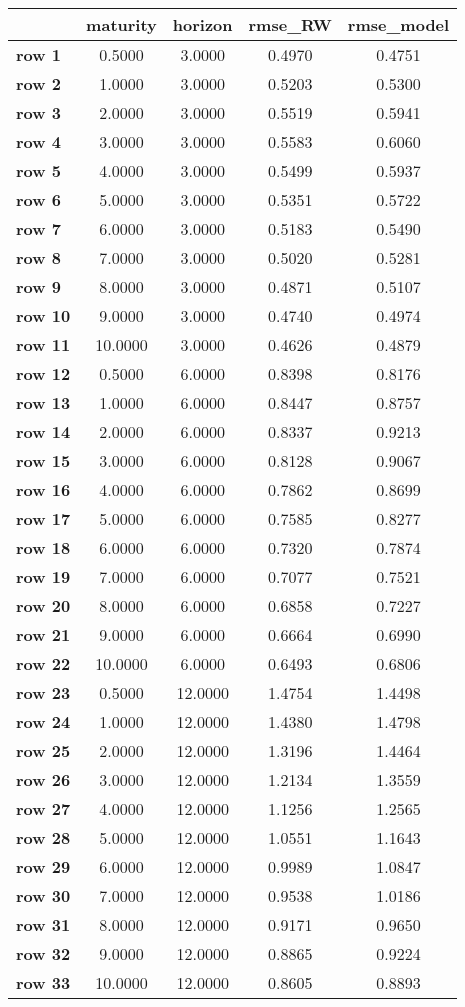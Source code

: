 \begin{tiny}\begin{tabular}{|l|c|c|c|c|}
\hline
&\textbf{maturity}&\textbf{horizon}&\textbf{rmse_RW}&\textbf{rmse_model}\\\hline
\textbf{row 1}&0.5000&3.0000&0.4970&0.4751\\\hline
\textbf{row 2}&1.0000&3.0000&0.5203&0.5300\\\hline
\textbf{row 3}&2.0000&3.0000&0.5519&0.5941\\\hline
\textbf{row 4}&3.0000&3.0000&0.5583&0.6060\\\hline
\textbf{row 5}&4.0000&3.0000&0.5499&0.5937\\\hline
\textbf{row 6}&5.0000&3.0000&0.5351&0.5722\\\hline
\textbf{row 7}&6.0000&3.0000&0.5183&0.5490\\\hline
\textbf{row 8}&7.0000&3.0000&0.5020&0.5281\\\hline
\textbf{row 9}&8.0000&3.0000&0.4871&0.5107\\\hline
\textbf{row 10}&9.0000&3.0000&0.4740&0.4974\\\hline
\textbf{row 11}&10.0000&3.0000&0.4626&0.4879\\\hline
\textbf{row 12}&0.5000&6.0000&0.8398&0.8176\\\hline
\textbf{row 13}&1.0000&6.0000&0.8447&0.8757\\\hline
\textbf{row 14}&2.0000&6.0000&0.8337&0.9213\\\hline
\textbf{row 15}&3.0000&6.0000&0.8128&0.9067\\\hline
\textbf{row 16}&4.0000&6.0000&0.7862&0.8699\\\hline
\textbf{row 17}&5.0000&6.0000&0.7585&0.8277\\\hline
\textbf{row 18}&6.0000&6.0000&0.7320&0.7874\\\hline
\textbf{row 19}&7.0000&6.0000&0.7077&0.7521\\\hline
\textbf{row 20}&8.0000&6.0000&0.6858&0.7227\\\hline
\textbf{row 21}&9.0000&6.0000&0.6664&0.6990\\\hline
\textbf{row 22}&10.0000&6.0000&0.6493&0.6806\\\hline
\textbf{row 23}&0.5000&12.0000&1.4754&1.4498\\\hline
\textbf{row 24}&1.0000&12.0000&1.4380&1.4798\\\hline
\textbf{row 25}&2.0000&12.0000&1.3196&1.4464\\\hline
\textbf{row 26}&3.0000&12.0000&1.2134&1.3559\\\hline
\textbf{row 27}&4.0000&12.0000&1.1256&1.2565\\\hline
\textbf{row 28}&5.0000&12.0000&1.0551&1.1643\\\hline
\textbf{row 29}&6.0000&12.0000&0.9989&1.0847\\\hline
\textbf{row 30}&7.0000&12.0000&0.9538&1.0186\\\hline
\textbf{row 31}&8.0000&12.0000&0.9171&0.9650\\\hline
\textbf{row 32}&9.0000&12.0000&0.8865&0.9224\\\hline
\textbf{row 33}&10.0000&12.0000&0.8605&0.8893\\\hline
\end{tabular}
\end{tiny}